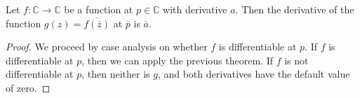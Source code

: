 \begin{theorem}
\label{deriv_conj_conj'}
\leanok
Let $f : \mathbb{C} \to \mathbb{C}$ be a function at $p \in \mathbb{C}$ with derivative $a$.
    Then the derivative of the function $g(z) = \overline{f(\overline{z})}$ at $\overline{p}$ is
    $\overline{a}$.
\end{theorem}
\begin{proof}
\leanok
We proceed by case analysis on whether $f$ is differentiable at $p$. If $f$ is differentiable
    at $p$, then we can apply the previous theorem. If $f$ is not differentiable at $p$, then
    neither is $g$, and both derivatives have the default value of zero.
\end{proof}
